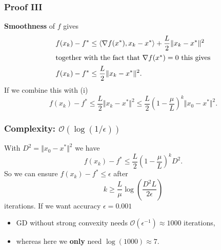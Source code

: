 \documentclass{beamer}
\begin{document}
\begin{frame}
  \frametitle{Proof III}
  \textbf{Smoothness} of $f$ gives
  \begin{align}
    f(x_k) - f^* &\le \langle \nabla f(x^*), x_k-x^* \rangle + \frac{L}{2} \Vert x_k-x^* \Vert^2\\
    \intertext{together with the fact that $\nabla f(x^*)=0$ this gives}
    f(x_k) - f^* &\le \frac{L}{2} \Vert x_k-x^* \Vert^2.
  \end{align}
  If we combine this with (i)
  \begin{equation}
     f(x_k) - f^* \le \frac{L}{2} \Vert x_k-x^* \Vert^2 \le \frac{L}{2} {\left(1-\frac{\mu}{L}\right)}^k\Vert x_0-x^* \Vert^2.
  \end{equation}
\end{frame}


\begin{frame}
  \frametitle{Complexity: $\mathcal{O}(\log(1/\epsilon))$}
  With $D^2=\Vert x_0-x^* \Vert^2$ we have
  \begin{equation}
    f(x_k) - f^* \le \frac{L}{2} {\left(1-\frac{\mu}{L}\right)}^k D^2.
  \end{equation}
  So we can ensure $f(x_k)-f^* \le \epsilon$ after
  \begin{equation}
    k \ge \frac{L}{\mu} \log\left(\frac{D^2L}{2 \epsilon}\right)
  \end{equation}
  iterations.
  If we want accuracy $\epsilon=0.001$
  \begin{itemize}
    \item GD without strong convexity needs $\mathcal{O}(\epsilon^{-1})\approx1000$ iterations,
    \item whereas here we \textbf{only} need $\log(1000)\approx 7$.
  \end{itemize}

\end{frame}
\end{document}
